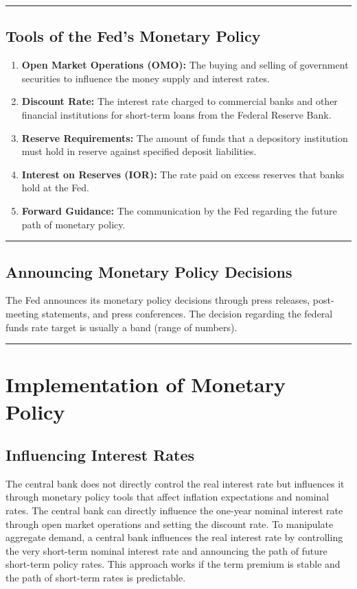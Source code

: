 \documentclass{article}
\begin{document}
\noindent\rule{\linewidth}{0.5pt}

\subsection{Tools of the Fed’s Monetary Policy}
\begin{enumerate}
    \item \textbf{Open Market Operations (OMO):} The buying and selling of government securities to influence the money supply and interest rates.
    \item \textbf{Discount Rate:} The interest rate charged to commercial banks and other financial institutions for short-term loans from the Federal Reserve Bank.
    \item \textbf{Reserve Requirements:} The amount of funds that a depository institution must hold in reserve against specified deposit liabilities.
    \item \textbf{Interest on Reserves (IOR):} The rate paid on excess reserves that banks hold at the Fed.
    \item \textbf{Forward Guidance:} The communication by the Fed regarding the future path of monetary policy.
\end{enumerate}

\noindent\rule{\linewidth}{0.5pt}

\subsection{Announcing Monetary Policy Decisions}
The Fed announces its monetary policy decisions through press releases, post-meeting statements, and press conferences. The decision regarding the federal funds rate target is usually a band (range of numbers).

\noindent\rule{\linewidth}{1pt}

\section{Implementation of Monetary Policy}

\subsection{Influencing Interest Rates}
The central bank does not directly control the real interest rate but influences it through monetary policy tools that affect inflation expectations and nominal rates. The central bank can directly influence the one-year nominal interest rate through open market operations and setting the discount rate. To manipulate aggregate demand, a central bank influences the real interest rate by controlling the very short-term nominal interest rate and announcing the path of future short-term policy rates. This approach works if the term premium is stable and the path of short-term rates is predictable.
\end{document}
